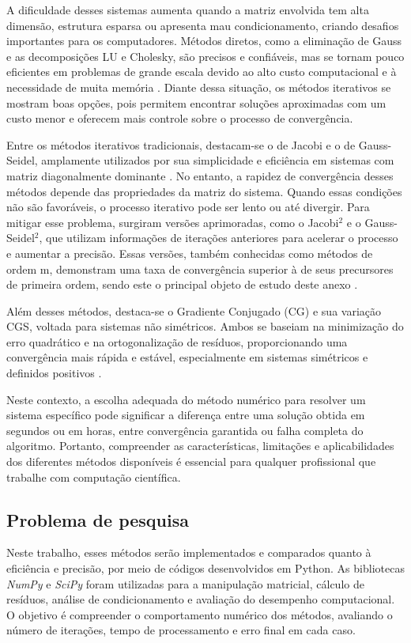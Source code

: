 \documentclass[12pt,a4paper]{article}
\begin{document}
A dificuldade desses sistemas aumenta quando a matriz envolvida tem alta dimensão, estrutura esparsa ou apresenta mau condicionamento, criando desafios importantes para os computadores. Métodos diretos, como a eliminação de Gauss e as decomposições LU e Cholesky, são precisos e confiáveis, mas se tornam pouco eficientes em problemas de grande escala devido ao alto custo computacional e à necessidade de muita memória \citep{CHAPRA2015}. Diante dessa situação, os métodos iterativos se mostram boas opções, pois permitem encontrar soluções aproximadas com um custo menor e oferecem mais controle sobre o processo de convergência.

Entre os métodos iterativos tradicionais, destacam-se o de Jacobi e o de Gauss-Seidel, amplamente utilizados por sua simplicidade e eficiência em sistemas com matriz diagonalmente dominante \citep{BURDEN2011}. No entanto, a rapidez de convergência desses métodos depende das propriedades da matriz do sistema. Quando essas condições não são favoráveis, o processo iterativo pode ser lento ou até divergir. Para mitigar esse problema, surgiram versões aprimoradas, como o Jacobi$^2$ e o Gauss-Seidel$^2$, que utilizam informações de iterações anteriores para acelerar o processo e aumentar a precisão. Essas versões, também conhecidas como métodos de ordem m, demonstram uma taxa de convergência superior à de seus precursores de primeira ordem, sendo este o principal objeto de estudo deste anexo \citep{ALVAREZ2022}. 

Além desses métodos, destaca-se o Gradiente Conjugado (CG) e sua variação CGS, voltada para sistemas não simétricos. Ambos se baseiam na minimização do erro quadrático e na ortogonalização de resíduos, proporcionando uma convergência mais rápida e estável, especialmente em sistemas simétricos e definidos positivos \citep{SAAD2003}.

Neste contexto, a escolha adequada do método numérico para resolver um sistema específico pode significar a diferença entre uma solução obtida em segundos ou em horas, entre convergência garantida ou falha completa do algoritmo. Portanto, compreender as características, limitações e aplicabilidades dos diferentes métodos disponíveis é essencial para qualquer profissional que trabalhe com computação científica.

\subsection{Problema de pesquisa}

Neste trabalho, esses métodos serão implementados e comparados quanto à eficiência e precisão, por meio de códigos desenvolvidos em Python. As bibliotecas \textit{NumPy} e \textit{SciPy} foram utilizadas para a manipulação matricial, cálculo de resíduos, análise de condicionamento e avaliação do desempenho computacional. O objetivo é compreender o comportamento numérico dos métodos, avaliando o número de iterações, tempo de processamento e erro final em cada caso.
\end{document}
